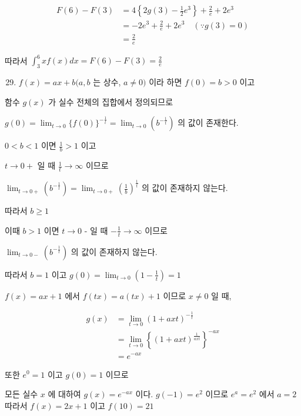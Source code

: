 \documentclass[10pt]{article}
\begin{document}
\[
\begin{aligned}
F(6)-F(3) & =4\left\{2 g(3)-\frac{1}{2} e^{3}\right\}+\frac{2}{e}+2 e^{3} \\
& =-2 e^{3}+\frac{2}{e}+2 e^{3} \quad(\because g(3)=0) \\
& =\frac{2}{e}
\end{aligned}
\]

따라서 \(\int_{3}^{6} x f(x) d x=F(6)-F(3)=\frac{2}{e}\)

\begin{enumerate}
  \setcounter{enumi}{28}
  \item \(f(x)=a x+b(a, b\) 는 상수, \(a \neq 0)\) 이라 하면 \(f(0)=b>0\) 이고
\end{enumerate}

함수 \(g(x)\) 가 실수 전체의 집합에서 정의되므로

\(g(0)=\lim _{t \rightarrow 0}\{f(0)\}^{-\frac{1}{t}}=\lim _{t \rightarrow 0}\left(b^{-\frac{1}{t}}\right)\) 의 값이 존재한다.

\(0<b<1\) 이면 \(\frac{1}{b}>1\) 이고

\(t \rightarrow 0+\) 일 때 \(\frac{1}{t} \rightarrow \infty\) 이므로

\(\lim _{t \rightarrow 0+}\left(b^{-\frac{1}{t}}\right)=\lim _{t \rightarrow 0+}\left(\frac{1}{b}\right)^{\frac{1}{t}}\) 의 값이 존재하지 않는다.

따라서 \(b \geq 1\)

이때 \(b>1\) 이면 \(t \rightarrow 0\) - 일 때 \(-\frac{1}{t} \rightarrow \infty\) 이므로

\(\lim _{t \rightarrow 0-}\left(b^{-\frac{1}{t}}\right)\) 의 값이 존재하지 않는다.

따라서 \(b=1\) 이고 \(g(0)=\lim _{t \rightarrow 0}\left(1-\frac{1}{t}\right)=1\)

\(f(x)=a x+1\) 에서 \(f(t x)=a(t x)+1\) 이므로 \(x \neq 0\) 일 때,

\[
\begin{aligned}
g(x) & =\lim _{t \rightarrow 0}(1+a x t)^{-\frac{1}{t}} \\
& =\lim _{t \rightarrow 0}\left\{(1+a x t)^{\frac{1}{a x t}}\right\}^{-a x} \\
& =e^{-a x}
\end{aligned}
\]

또한 \(e^{0}=1\) 이고 \(g(0)=1\) 이므로

모든 실수 \(x\) 에 대하여 \(g(x)=e^{-a x}\) 이다. \(g(-1)=e^{2}\) 이므로 \(e^{a}=e^{2}\) 에서 \(a=2\) 따라서 \(f(x)=2 x+1\) 이고 \(f(10)=21\)
\end{document}
